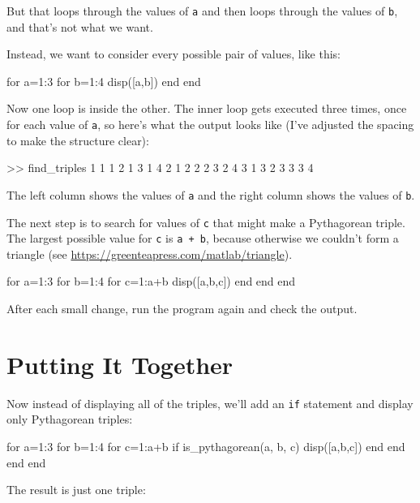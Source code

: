 But that loops through the values of \lstinline{a} and then loops through the values of \lstinline{b}, and that's not what we want.

Instead, we want to consider every possible pair of values, like this:

\begin{code}
for a=1:3
    for b=1:4
        disp([a,b])
    end
end
\end{code}

Now one loop is inside the other.  The inner loop gets executed three times, once for each value of \lstinline{a}, so here's what the output looks like (I've adjusted the spacing to make the structure clear):

\begin{code}
>> find_triples
     1     1
     1     2
     1     3
     1     4
     2     1
     2     2
     2     3
     2     4
     3     1
     3     2
     3     3
     3     4
\end{code}

The left column shows the values of \lstinline{a} and the right column shows the values of \lstinline{b}.

The next step is to search for values of \lstinline{c} that might make a Pythagorean triple.  The largest possible value for \lstinline{c} is \lstinline{a + b}, because otherwise we couldn't form a triangle
(see \url{https://greenteapress.com/matlab/triangle}).

\begin{code}
for a=1:3
    for b=1:4
        for c=1:a+b
            disp([a,b,c])
        end
    end
end
\end{code}

After each small change, run the program again and check the output.

\section{Putting It Together}

Now instead of displaying all of the triples, we'll add an \lstinline{if} statement and display only Pythagorean triples:

\begin{code}
for a=1:3
    for b=1:4
        for c=1:a+b
            if is_pythagorean(a, b, c)
                disp([a,b,c])
            end
        end
    end
end
\end{code}

The result is just one triple:

